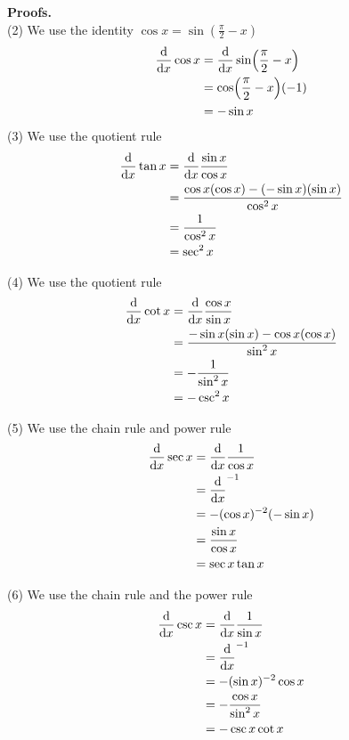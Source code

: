 \documentclass[working]{tuftebook}
\begin{document}
\textbf{Proofs.}\\
(2) We use the identity $ \cos x= \sin ( \frac{\pi}{2}-x)$
\begin{align*}
    \dv{}{x} \cos x&= \dv{}{x} \sin ( \frac{\pi}{2}-x)\\ 
                   &= \cos ( \frac{\pi}{2}-x)(-1)\\ 
                   &=- \sin x 
\end{align*}
(3)  We use the quotient rule 
\begin{align*}
    \dv{}{x} \tan x&= \dv{}{x} \frac{ \sin x}{ \cos x}\\ 
    &= \frac{ \cos x (\cos x)- (- \sin x)( \sin x)}{ \cos ^2x}\\ 
    &= \frac{1}{ \cos ^2x}\\ 
    &= \sec ^2x
\end{align*}

(4) We use the quotient rule 
\begin{align*}
    \dv{}{x} \cot x&= \dv{}{x} \frac{ \cos x}{ \sin x}\\ 
                   &= \frac{- \sin x( \sin x)- \cos x( \cos x)}{ \sin ^2x}\\ 
                   &= -\frac{1}{ \sin ^2x}\\ 
                   &=- \csc ^2x
\end{align*}

(5) We use the chain rule and power rule 
\begin{align*}
    \dv{}{x} \sec x&= \dv{}{x}\frac{1}{ \cos x}\\ 
                   &= \dv{}{x}( \cos x)^{-1}\\ 
                   &= -( \cos x)^{-2}(- \sin x)\\ 
                   &= \frac{ \sin x}{ \cos x}\\ 
                   &= \sec x \tan x
\end{align*}

(6) We use the chain rule and the power rule 
\begin{align*}
    \dv{}{x} \csc x&= \dv{}{x} \frac{1}{ \sin x}\\ 
                   &= \dv{}{x}( \sin x)^{-1}\\ 
                   &= -( \sin x)^{-2} \cos x\\ 
                   &= - \frac{ \cos x}{ \sin ^2x}\\ 
                   &=- \csc x \cot  x
\end{align*}
\end{document}
